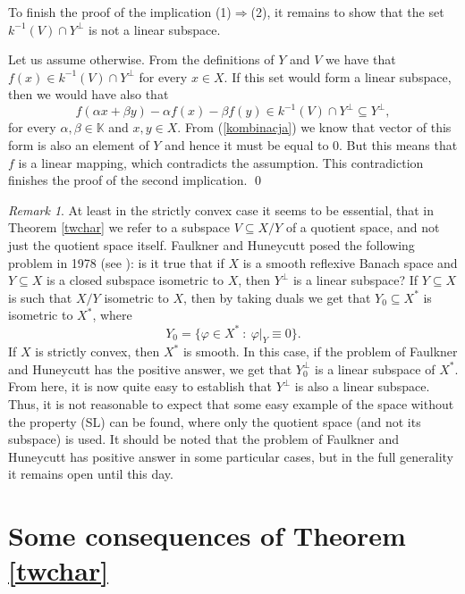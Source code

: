 \documentclass[12pt, reqno]{amsart}
\theoremstyle{definition}
\theoremstyle{remark}
\newtheorem{remark}[theorem]{Remark}
\numberwithin{equation}{section}
\begin{document}
To finish the proof of the implication (1)$\Rightarrow$(2), it remains to show that the set $k^{-1}(V) \cap Y^{\perp}$ is not a linear subspace.

Let us assume otherwise. From the definitions of $Y$ and $V$ we have that $f(x) \in k^{-1}(V) \cap Y^{\perp}$ for every $x \in X$. If this set would form a linear subspace, then we would have also that
$$f(\alpha x + \beta y) - \alpha f(x) - \beta f(y) \in k^{-1}(V) \cap Y^{\perp} \subseteq Y^{\perp},$$
for every $\alpha, \beta \in \mathbb{K}$ and $x, y \in X$. From (\ref{kombinacja}) we know that vector of this form is also an element of $Y$ and hence it must be equal to $0$. But this means that $f$ is a linear mapping, which contradicts the assumption. This contradiction finishes the proof of the second implication. \qed

\begin{remark}
\label{remarkproblem}
At least in the strictly convex case it seems to be essential, that in Theorem \ref{twchar} we refer to a subspace $V \subseteq X/Y$ of a quotient space, and not just the quotient space itself. Faulkner and Huneycutt posed the following problem in 1978 (see \cite{faulkner}): is it true that if $X$ is a smooth reflexive Banach space and $Y \subseteq X$ is a closed subspace isometric to $X$, then $Y^{\perp}$ is a linear subspace? If $Y \subseteq X$ is such that $X/Y$ isometric to $X$, then by taking duals we get that $Y_0 \subseteq X^{*}$ is isometric to $X^{*}$, where 
$$Y_0 = \{ \varphi \in X^* \ : \ \varphi|_Y \equiv 0 \}.$$
If $X$ is strictly convex, then $X^*$ is smooth. In this case, if the problem of Faulkner and Huneycutt has the positive answer, we get that $Y^{\perp}_0$ is a linear subspace of $X^*$. From here, it is now quite easy to establish that $Y^{\perp}$ is also a linear subspace. Thus, it is not reasonable to expect that some easy example of the space without the property (SL) can be found, where only the quotient space (and not its subspace) is used. It should be noted that the problem of Faulkner and Huneycutt has positive answer in some particular cases, but in the full generality it remains open until this day. 
\end{remark}

\section{Some consequences of Theorem \ref{twchar}}
\label{sectionconsequences}
\end{document}
